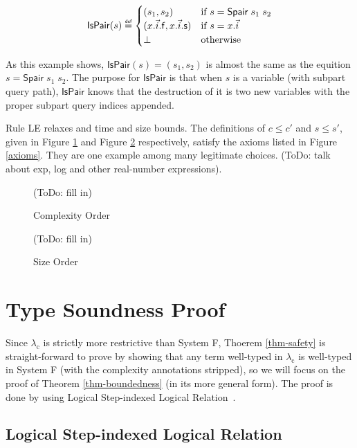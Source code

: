 \documentclass[preprint]{sigplanconf}
\newcommand{\symf}{\mathsf{f}}
\newcommand{\syms}{\mathsf{s}}
\newcommand{\symSpair}{\mathsf{Spair}}
\newcommand\defeq{\mathrel{\overset{\makebox[0pt]{\mbox{\normalfont\tiny\sffamily def}}}{=}}}
\newcommand{\logo}{\lambda_\mathrm{c}}
\begin{document}
$$
\mathsf{IsPair}(s)\defeq\begin{cases}
(s_1, s_2) & \mbox{if } s = \symSpair\;s_1\;s_2 \\
(x.\vec{i}.\symf, x.\vec{i}.\syms) & \mbox{if } s = x.\vec{i} \\
\bot & \mbox{otherwise}\\
\end{cases}
$$

As this example shows, $\mathsf{IsPair}(s)=(s_1,s_2)$ is almost the same as the equition $s = \symSpair\;s_1\;s_2$. The purpose for $\mathsf{IsPair}$ is that when $s$ is a variable (with subpart query path), $\mathsf{IsPair}$ knows that the destruction of it is two new variables with the proper subpart query indices appended.

Rule {\sc LE} relaxes and time and size bounds. The definitions of $c\leq c'$ and $s\leq s'$, given in Figure \ref{cle} and Figure \ref{sle} respectively, satisfy the axioms listed in Figure \ref{axioms}. They are one example among many legitimate choices. (ToDo: talk about exp, log and other real-number expressions).

\begin{figure}
\begin{mathpar}
\end{mathpar}
(ToDo: fill in)
\caption{\label{cle}Complexity Order}
\end{figure}

\begin{figure}
\begin{mathpar}
\end{mathpar}
(ToDo: fill in)
\caption{\label{sle}Size Order}
\end{figure}


\section{\label{section-proof}Type Soundness Proof}

Since $\logo$ is strictly more restrictive than System F, Thoerem \ref{thm-safety} is straight-forward to prove by showing that any term well-typed in $\logo$ is well-typed in System F (with the complexity annotations stripped), so we will focus on the proof of Theorem \ref{thm-boundedness} (in its more general form). The proof is done by using Logical Step-indexed Logical Relation~\cite{dreyer2009logical}.

\subsection {Logical Step-indexed Logical Relation}
\end{document}

